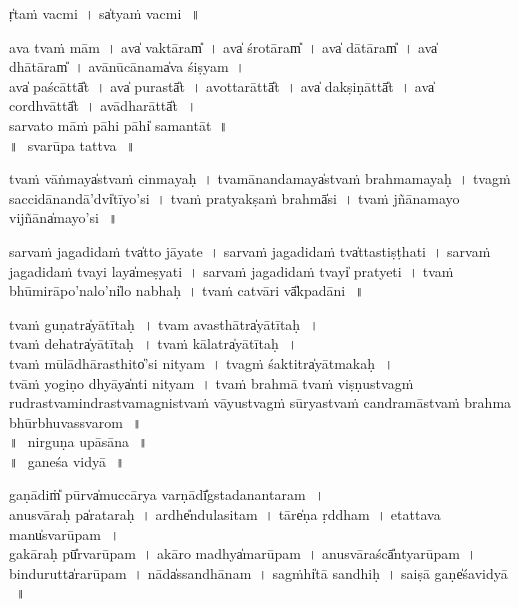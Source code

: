 \documentclass[parskip, DIV=14]{scrartcl}
\begin{document}
\vspace{1cm}

ṛ̍taṁ va॒cmi~। sa̍tyaṁ va॒cmi\,~॥ \\

\vspace{0.5cm}

a॒va tva॒ṁ mām~। ava̍ va॒ktāram̎~। ava̍ śro॒tāram̎~। ava̍ dā॒tāram̎~। ava̍ dhā॒tāram̎~।
avānūcānama̍va śi॒ṣyam~। \\ ava̍ pa॒ścāttā̎t~।
ava̍ pu॒rastā̎t~। 
avotta॒rāttā̎t~।
ava̍ dakṣi॒ṇāttā̎t~।
ava̍ co॒rdhvāttā̎t~।
avādha॒rāttā̎t\,~।\\
sarvato māṁ pāhi pāhi̍ sama॒ntāt~॥\\

\vspace{1cm}
॥\,~svarūpa tattva\,~॥ \\
\vspace{0.5cm}

tvaṁ vāṅmaya̍stvaṁ cinma॒yaḥ~।
tvamānandamaya̍stvaṁ brahma॒mayaḥ~।
tvagṁ saccidānandā’dvi̍tīyo॒’si~।
tvaṁ pra॒tyakṣa॒ṁ brahmā̍si~।
tvaṁ jñānamayo vijñāna̍mayo॒’si\,~॥\\

\vspace{0.5cm}

sarvaṁ jagadidaṁ tva̍tto jā॒yate~। sarvaṁ jagadidaṁ tva̍ttasti॒ṣṭhati~। sarvaṁ jagadidaṁ tvayi laya̍meṣya॒ti~।
sarvaṁ jagadidaṁ tvayi̍ pratye॒ti~। tvaṁ bhūmirāpo’nalo’ni̍lo na॒bhaḥ~। tvaṁ catvāri vā̎kpadā॒ni\,~॥\\

\vspace{0.5cm}

tvaṁ gu॒ṇatra̍yātī॒taḥ\,~।
tvam avasthātra̍yātī॒taḥ\,~।\\
tvaṁ de॒hatra̍yātī॒taḥ\,~।
tvaṁ kā॒latra̍yātī॒taḥ\,~।\\
tvaṁ mūlādhārasthito̍’si ni॒tyam~। 
tvagṁ śaktitra̍yātma॒kaḥ\,~।\\
tvāṁ yogiṇo dhyāya̍nti ni॒tyam~।
tvaṁ brahmā tvaṁ viṣṇustvagṁ
rudrastvamindrastvamagnistvaṁ vāyustvagṁ sūryastvaṁ candramāstvaṁ brahma॒
bhūrbhuva॒ssvarom\,~॥\\

\vspace{1cm}
॥\,~nirguṇa upāsāna\,~॥ \\
\vspace{0.5cm}
॥\,~ganeśa vidyā\,~॥ \\
\vspace{0.5cm}

ga॒ṇādiṁ̎ pūrva̍muccā॒rya॒ va॒rṇādī̎gstada॒nantaram\,~।\\ 
anusvāraḥ pa̍rata॒raḥ~।
ardhe̎ndula॒sitam~।
tāre̍ṇa ṛ॒ddham~।
etattava manu̍svarū॒pam\,~।\\ 
gakāraḥ pū̎rvarū॒pam~।
 akāro madhya̍marū॒pam~। anusvāraścā̎ntyarū॒pam~। bindurutta̍rarū॒pam~। nāda̍ssandhā॒nam~।
  sagṁhi̍tā sa॒ndhiḥ~।
saiṣā gaṇe̍śavi॒dyā\,~॥\\ 
\end{document}
